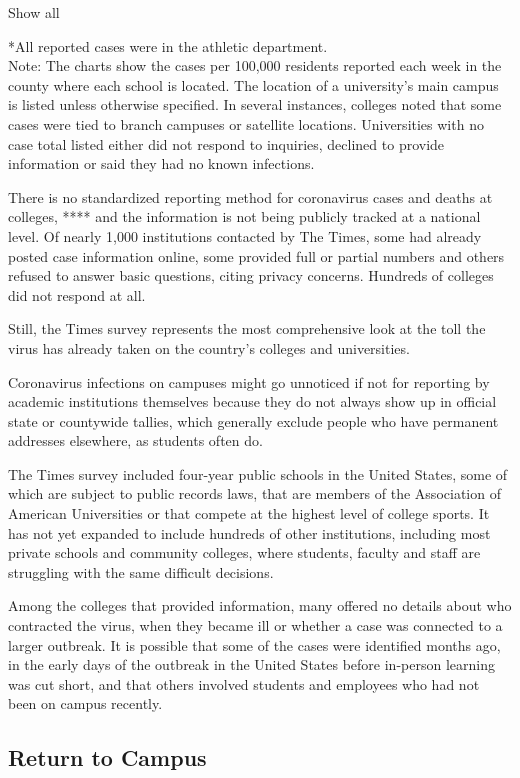 Show all

*All reported cases were in the athletic department.\\
Note: The charts show the cases per 100,000 residents reported each week
in the county where each school is located. The location of a
university's main campus is listed unless otherwise specified. In
several instances, colleges noted that some cases were tied to branch
campuses or satellite locations. Universities with no case total listed
either did not respond to inquiries, declined to provide information or
said they had no known infections.

There is no standardized reporting method for coronavirus cases and
deaths at colleges, **** and the information is not being publicly
tracked at a national level. Of nearly 1,000 institutions contacted by
The Times, some had already posted case information online, some
provided full or partial numbers and others refused to answer basic
questions, citing privacy concerns. Hundreds of colleges did not respond
at all.

Still, the Times survey represents the most comprehensive look at the
toll the virus has already taken on the country's colleges and
universities.

Coronavirus infections on campuses might go unnoticed if not for
reporting by academic institutions themselves because they do not always
show up in official state or countywide tallies, which generally exclude
people who have permanent addresses elsewhere, as students often do.

The Times survey included four-year public schools in the United States,
some of which are subject to public records laws, that are members of
the Association of American Universities or that compete at the highest
level of college sports. It has not yet expanded to include hundreds of
other institutions, including most private schools and community
colleges, where students, faculty and staff are struggling with the same
difficult decisions.

Among the colleges that provided information, many offered no details
about who contracted the virus, when they became ill or whether a case
was connected to a larger outbreak. It is possible that some of the
cases were identified months ago, in the early days of the outbreak in
the United States before in-person learning was cut short, and that
others involved students and employees who had not been on campus
recently.

\hypertarget{return-to-campus}{%
\subsection{Return to Campus}\label{return-to-campus}}

